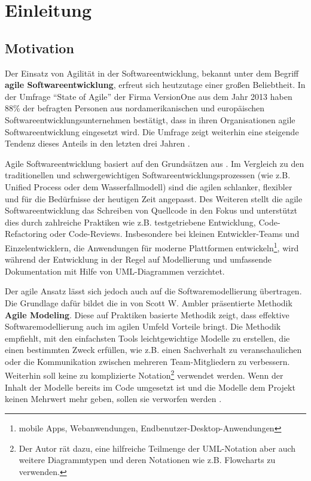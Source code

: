 
\chapter{Einleitung}
\label{chapter:introduction}

\section{Motivation}

Der Einsatz von Agilität in der Softwareentwicklung, bekannt unter dem Begriff \textbf{agile Softwareentwicklung}, erfreut sich heutzutage einer großen Beliebtheit. In der Umfrage \enquote{State of Agile} der Firma VersionOne aus dem Jahr 2013 haben 88\% der befragten Personen aus nordamerikanischen und europäischen Softwareentwicklungsunternehmen bestätigt, dass in ihren Organisationen agile Softwareentwicklung eingesetzt wird. Die Umfrage zeigt weiterhin eine steigende Tendenz dieses Anteils in den letzten drei Jahren \cite{VersionOne148th-Annual}.

Agile Softwareentwicklung basiert auf den Grundsätzen aus \cite{BeckBeedle01Manifest}. Im Vergleich zu den traditionellen und schwergewichtigen Softwareentwicklungsprozessen (wie z.B. Unified Process oder dem Wasserfallmodell) sind die agilen schlanker, flexibler und für die Bedürfnisse der heutigen Zeit angepasst. Des Weiteren stellt die agile Softwareentwicklung das Schreiben von Quellcode in den Fokus und unterstützt dies durch zahlreiche Praktiken wie z.B. testgetriebene Entwicklung, Code-Refactoring oder Code-Reviews. Insbesondere bei kleinen Entwickler-Teams und Einzelentwicklern, die Anwendungen für moderne Plattformen entwickeln\footnote{mobile Apps, Webanwendungen, Endbenutzer-Desktop-Anwendungen}, wird während der Entwicklung in der Regel auf Modellierung und umfassende Dokumentation mit Hilfe von UML-Dia\-gram\-men verzichtet.

Der agile Ansatz lässt sich jedoch auch auf die Softwaremodellierung übertragen. Die Grundlage dafür bildet die in \cite{Ambler02Agile} von Scott W. Ambler präsentierte Methodik \textbf{Agile Modeling}. Diese auf Praktiken basierte Methodik zeigt, dass effektive Softwaremodellierung auch im agilen Umfeld Vorteile bringt. Die Methodik empfiehlt, mit den einfachsten Tools leichtgewichtige Modelle zu erstellen, die einen bestimmten Zweck erfüllen, wie z.B. einen Sachverhalt zu veranschaulichen oder die Kommunikation zwischen mehreren Team-Mitgliedern zu verbessern. Weiterhin soll keine zu komplizierte Notation\footnote{Der Autor rät dazu, eine hilfreiche Teilmenge der UML-Notation aber auch weitere Diagrammtypen und deren Notationen wie z.B. Flowcharts zu verwenden.} verwendet werden. Wenn der Inhalt der Modelle bereits im Code umgesetzt ist und die Modelle dem Projekt keinen Mehrwert mehr geben, sollen sie verworfen werden \cite{Ambler02Agile}.

